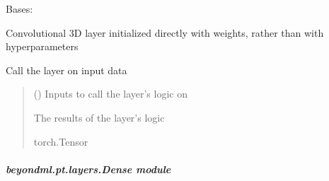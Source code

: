\documentclass[letterpaper,10pt,english]{sphinxmanual}
\begin{document}
\begin{fulllineitems}
\label{\detokenize{beyondml.pt.layers:beyondml.pt.layers.Conv3D.Conv3D}}
\pysigstartsignatures
{}
\pysigstopsignatures
\sphinxAtStartPar
Bases: 

\sphinxAtStartPar
Convolutional 3D layer initialized directly with weights, rather than with hyperparameters

\begin{fulllineitems}
\label{\detokenize{beyondml.pt.layers:beyondml.pt.layers.Conv3D.Conv3D.forward}}
\pysigstartsignatures
{}
\pysigstopsignatures
\sphinxAtStartPar
Call the layer on input data
\begin{quote}\begin{description}
\sphinxAtStartPar
{} () \textendash{} Inputs to call the layer’s logic on

\sphinxAtStartPar
{} \textendash{} The results of the layer’s logic

\sphinxAtStartPar
torch.Tensor

\end{description}\end{quote}

\end{fulllineitems}


\end{fulllineitems}



\subparagraph{beyondml.pt.layers.Dense module}
\label{\detokenize{beyondml.pt.layers:module-beyondml.pt.layers.Dense}}\label{\detokenize{beyondml.pt.layers:beyondml-pt-layers-dense-module}}
\end{document}

